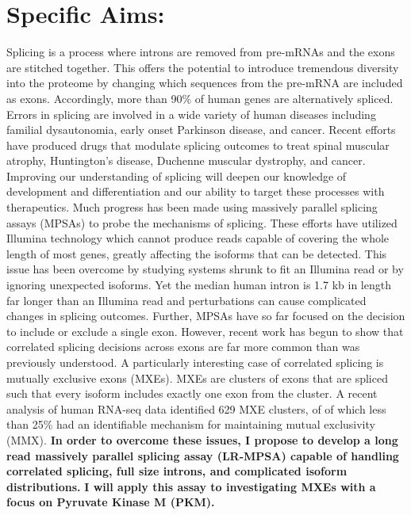 \documentclass[11pt]{article}
\begin{document}
\section*{Specific Aims:}
%
Splicing is a process where introns are removed from pre-mRNAs and the exons are stitched together. 
This offers the potential to introduce tremendous diversity into the proteome by changing which sequences from the pre-mRNA are included as exons.
Accordingly, more than 90\% of human genes are alternatively spliced.\supercite{Wang2008-ej} 
Errors in splicing are involved in a wide variety of human diseases including familial dysautonomia, early onset Parkinson disease, and cancer.\supercite{Scotti2015-yp} 
Recent efforts have produced drugs that modulate splicing outcomes to treat spinal muscular atrophy, Huntington's disease, Duchenne muscular dystrophy, and cancer.\supercite{Neil2022-vf}
Improving our understanding of splicing will deepen our knowledge of development and differentiation and our ability to target these processes with therapeutics.
Much progress has been made using massively parallel splicing assays (MPSAs) to probe the mechanisms of splicing.\supercite{Ke2018-af, Julien2016-wa, Adamson2018-va, Soemedi2017-pz, Cortes-Lopez2022-gy, Schirman2021-ss, Mikl2019-ng, Braun2018-mb, Soucek2019-iq, Baeza-Centurion2020-tn, Cheung2019-ah, Baeza-Centurion2019-hz, Rosenberg2015-zs, Wong2018-vq} 
These efforts have utilized Illumina technology which cannot produce reads capable of covering the whole length of most genes, greatly affecting the isoforms that can be detected.
This issue has been overcome by studying systems shrunk to fit an Illumina read or by ignoring unexpected isoforms.
Yet the median human intron is 1.7 kb in length\supercite{Piovesan2019-rp} far longer than an Illumina read and perturbations can cause complicated changes in splicing outcomes.\supercite{Cortes-Lopez2022-gy,Wang2012-dr,Mathur2019-hy}
Further, MPSAs have so far focused on the decision to include or exclude a single exon.
However, recent work has begun to show that correlated splicing decisions across exons are far more common than was previously understood.\supercite{Zhu2021-fs, Tilgner2015-sb, Hatje2017-oj,Tilgner2018-jo} 
A particularly interesting case of correlated splicing is mutually exclusive exons (MXEs). 
MXEs are clusters of exons that are spliced such that every isoform includes exactly one exon from the cluster. 
A recent analysis of human RNA-seq data identified 629 MXE clusters, of of which less than 25\% had an identifiable mechanism for maintaining mutual exclusivity (MMX).\supercite{Hatje2017-oj} 
\textbf{In order to overcome these issues, I propose to develop a long read massively parallel splicing assay (LR-MPSA) capable of handling correlated splicing, full size introns, and complicated isoform distributions.} 
\textbf{I will apply this assay to investigating MXEs with a focus on Pyruvate Kinase M (PKM).} 
\\
\end{document}
